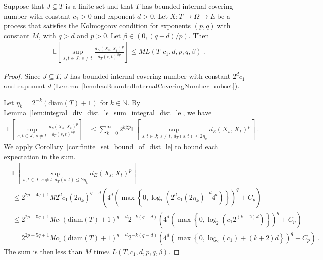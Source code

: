\begin{lemma}\label{lem:finite_set_bound}
  \leanok
Suppose that $J \subseteq T$ is a finite set and that $T$ has bounded internal covering number with constant $c_1>0$ and exponent $d > 0$.
Let $X : T \to \Omega \to E$ be a process that satisfies the Kolmogorov condition for exponents $(p,q)$ with constant $M$, with $q > d$ and $p > 0$.
Let $\beta \in(0, (q - d)/p)$.
Then
\begin{align*}
  \mathbb{E}\left[ \sup_{s, t \in J;\: s \ne t} \frac{d_E(X_s, X_t)^p}{d_T(s, t)^{\beta p}} \right]
  \le M L(T, c_1, d, p, q, \beta)
  \: .
\end{align*}
\end{lemma}

\begin{proof}
  \leanok

Since $J \subseteq T$, $J$ has bounded internal covering number with constant $2^d c_1$ and exponent $d$ (Lemma~\ref{lem:hasBoundedInternalCoveringNumber_subset}).

Let $\eta_k = 2^{-k}(\mathrm{diam}(T) + 1)$ for $k \in \mathbb{N}$.
By Lemma~\ref{lem:integral_div_dist_le_sum_integral_dist_le}, we have
\begin{align*}
  \mathbb{E}\left[ \sup_{s, t \in J;\: s \ne t} \frac{d_E(X_s, X_t)^p}{d_T(s, t)^{\beta p}} \right]
  &\le \sum_{k=0}^\infty 2^{k \beta p} \mathbb{E}\left[ \sup_{s, t \in J;\: s \ne t, \: d_T(s, t) \le 2 \eta_k} d_E(X_s, X_t)^p \right]
  \: .
\end{align*}
We apply Corollary~\ref{cor:finite_set_bound_of_dist_le} to bound each expectation in the sum.
\begin{align*}
  &\mathbb{E}\left[ \sup_{s, t \in J;\: s \ne t, \: d_T(s, t) \le 2 \eta_k} d_E(X_s, X_t)^p \right]
  \\
  &\le 2^{2p+4q+1} M 2^d c_1 (2 \eta_k)^{q-d} \left(4^d \left(\max\left\{0, \log_2 \left(2^d c_1 (2 \eta_k)^{-d} 4^d \right) \right\} \right)^q
    + C_p\right)
  \\
  &\le 2^{2p+5q+1} M c_1 (\mathrm{diam}(T)+1)^{q-d} 2^{-k(q-d)} \left(4^d \left(\max\left\{0, \log_2 \left(c_1 2^{(k + 2)d} \right) \right\} \right)^q
    + C_p\right)
  \\
  &= 2^{2p+5q+1} M c_1 (\mathrm{diam}(T)+1)^{q-d} 2^{-k(q-d)} \left(4^d \left(\max\left\{0, \log_2(c_1) + (k + 2)d \right\} \right)^q
    + C_p\right)
  \: .
\end{align*}
The sum is then less than $M$ times $L(T, c_1, d, p, q, \beta)$.
\end{proof}


